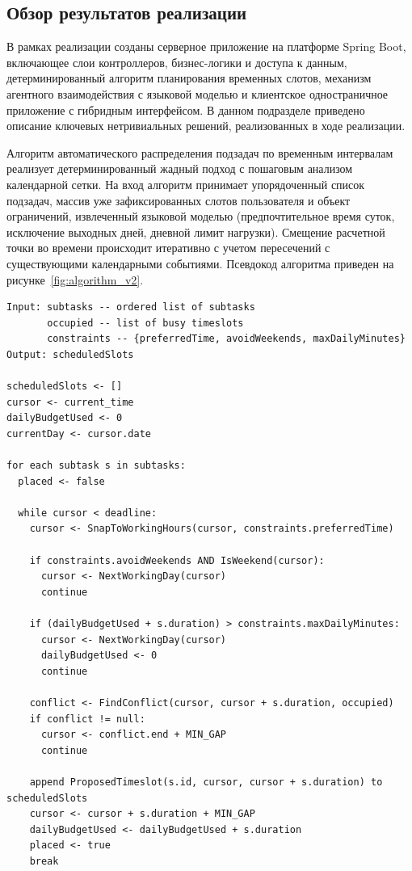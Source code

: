 \subsection{Обзор результатов реализации}

В рамках реализации созданы серверное приложение на платформе Spring Boot, включающее слои контроллеров, бизнес-логики и доступа к данным, детерминированный алгоритм планирования временных слотов, механизм агентного взаимодействия с языковой моделью и клиентское одностраничное приложение с гибридным интерфейсом. В данном подразделе приведено описание ключевых нетривиальных решений, реализованных в ходе реализации.


\numberedparagraph

\numberedparagraph
Алгоритм автоматического распределения подзадач по временным интервалам реализует детерминированный жадный подход с пошаговым анализом календарной сетки. На вход алгоритм принимает упорядоченный список подзадач, массив уже зафиксированных слотов пользователя и объект ограничений, извлеченный языковой моделью (предпочтительное время суток, исключение выходных дней, дневной лимит нагрузки). Смещение расчетной точки во времени происходит итеративно с учетом пересечений с существующими календарными событиями. Псевдокод алгоритма приведен на рисунке~\ref{fig:algorithm_v2}.

\begin{samepage}
\begin{lstlisting}[basicstyle=\footnotesize\ttfamily, frame=single,
    caption={Псевдокод алгоритма планирования временных слотов с учетом ограничений},
    label={fig:algorithm_v2}]
Input: subtasks -- ordered list of subtasks
       occupied -- list of busy timeslots
       constraints -- {preferredTime, avoidWeekends, maxDailyMinutes}
Output: scheduledSlots

scheduledSlots <- []
cursor <- current_time
dailyBudgetUsed <- 0
currentDay <- cursor.date

for each subtask s in subtasks:
  placed <- false
  
  while cursor < deadline:
    cursor <- SnapToWorkingHours(cursor, constraints.preferredTime)
    
    if constraints.avoidWeekends AND IsWeekend(cursor):
      cursor <- NextWorkingDay(cursor)
      continue
      
    if (dailyBudgetUsed + s.duration) > constraints.maxDailyMinutes:
      cursor <- NextWorkingDay(cursor)
      dailyBudgetUsed <- 0
      continue
      
    conflict <- FindConflict(cursor, cursor + s.duration, occupied)
    if conflict != null:
      cursor <- conflict.end + MIN_GAP
      continue
      
    append ProposedTimeslot(s.id, cursor, cursor + s.duration) to scheduledSlots
    cursor <- cursor + s.duration + MIN_GAP
    dailyBudgetUsed <- dailyBudgetUsed + s.duration
    placed <- true
    break
\end{lstlisting}
\end{samepage}

